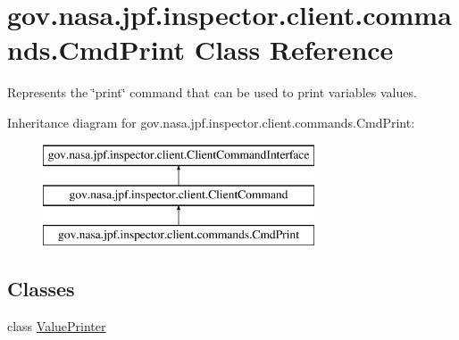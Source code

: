 \hypertarget{classgov_1_1nasa_1_1jpf_1_1inspector_1_1client_1_1commands_1_1_cmd_print}{}\section{gov.\+nasa.\+jpf.\+inspector.\+client.\+commands.\+Cmd\+Print Class Reference}
\label{classgov_1_1nasa_1_1jpf_1_1inspector_1_1client_1_1commands_1_1_cmd_print}


Represents the \char`\"{}print\char`\"{} command that can be used to print variables\textquotesingle{} values.  


Inheritance diagram for gov.\+nasa.\+jpf.\+inspector.\+client.\+commands.\+Cmd\+Print\+:\begin{figure}[H]
\begin{center}
\leavevmode
\includegraphics[height=3.000000cm]{classgov_1_1nasa_1_1jpf_1_1inspector_1_1client_1_1commands_1_1_cmd_print}
\end{center}
\end{figure}
\subsection*{Classes}
\begin{DoxyCompactItemize}
\item 
class \hyperlink{classgov_1_1nasa_1_1jpf_1_1inspector_1_1client_1_1commands_1_1_cmd_print_1_1_value_printer}{Value\+Printer}
\end{DoxyCompactItemize}
